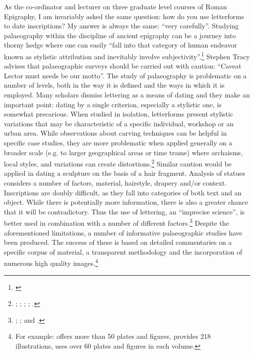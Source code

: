 \documentclass[amsthm,ebook]{saparticle}
\begin{document}
\noindent  As the co-ordinator and lecturer on three graduate level courses of Roman Epigraphy, I am invariably asked the same
question: how do you use letterforms to date inscriptions? My answer is always the same: ``very carefully''. Studying
palaeography within the discipline of ancient epigraphy can be a journey into thorny hedge where one can easily ``fall
into that category of human endeavor known as stylistic attribution and inevitably involve subjectivity''.\footnote{\citet[3-4]{tracy1995}} Stephen Tracy advises that palaeographic surveys should be carried out with caution: ``Caveat Lector
must needs be our motto''. The study of palaeography is problematic on a number of levels, both in the way it is
defined and the ways in which it is employed. Many scholars dismiss lettering as a means of dating and they make an
important point: dating by a single criterion, especially a stylistic one, is somewhat precarious. When studied in
isolation, letterforms present stylistic variations that may be characteristic of a specific individual, workshop or an
urban area. While observations about carving techniques can be helpful in specific case studies, they are more
problematic when applied generally on a broader scale (e.g. to larger geographical areas or time trame) where
archaisms, local styles, and variations can create distortions.\footnote{\citet{susini1973}; \citet{petrucci1993}; \citet[163-181]{Manzella1995}; \citet[433]{cooley2012}; \citet[122-125]{bruun2015}.} Similar caution would be applied in dating a
sculpture on the basis of a hair fragment. Analysis of statues considers a number of factors, material, hairstyle,
drapery and/or context. Inscriptions are doubly difficult, as they fall into categories of both text and an object.
While there is potentially more information, there is also a greater chance that it will be contradictory. Thus the use
of lettering, an ``imprecise science'', is better used in combination with a number of different factors.\footnote{\citet[26-9]{harris1989}; \citet[3-5]{bodel2001}; \citet[393-418]{Manzella2007} and \citet[432-435]{cooley2012}.} Despite the
aforementioned limitations, a number of informative palaeographic studies have been produced. The success of these is
based on detailed commentaries on a specific corpus of material, a transparent methodology and the incorporation of
numerous high quality images.\footnote{ For example: \citet{Gordon1957} offers more than 50 plates and figures, \citet{Manzella1987} provides 218 illustrations, \citet{tracy1990,tracy1995,tracy2003} uses over 60 plates and figures in each volume.}
\end{document}
